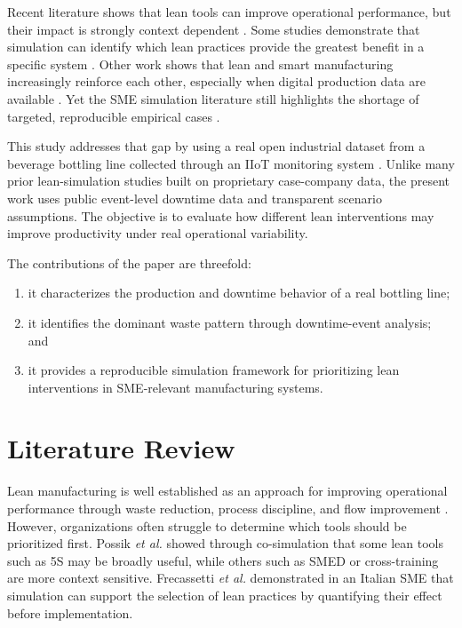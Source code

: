 \documentclass[journal]{IEEEtran}
\begin{document}
Recent literature shows that lean tools can improve operational performance, but their impact is strongly context dependent \cite{belekoukias2014lean, possik2022lean}. Some studies demonstrate that simulation can identify which lean practices provide the greatest benefit in a specific system \cite{frecassetti2023italian}. Other work shows that lean and smart manufacturing increasingly reinforce each other, especially when digital production data are available \cite{bokhorst2022smart, reslan2025digital}. Yet the SME simulation literature still highlights the shortage of targeted, reproducible empirical cases \cite{yu2021sme}.

This study addresses that gap by using a real open industrial dataset from a beverage bottling line collected through an IIoT monitoring system \cite{david2026dataset, david2024iot}. Unlike many prior lean-simulation studies built on proprietary case-company data, the present work uses public event-level downtime data and transparent scenario assumptions. The objective is to evaluate how different lean interventions may improve productivity under real operational variability.

The contributions of the paper are threefold:
\begin{enumerate}
    \item it characterizes the production and downtime behavior of a real bottling line;
    \item it identifies the dominant waste pattern through downtime-event analysis; and
    \item it provides a reproducible simulation framework for prioritizing lean interventions in SME-relevant manufacturing systems.
\end{enumerate}

\section{Literature Review}
Lean manufacturing is well established as an approach for improving operational performance through waste reduction, process discipline, and flow improvement \cite{belekoukias2014lean}. However, organizations often struggle to determine which tools should be prioritized first. Possik \emph{et al.} \cite{possik2022lean} showed through co-simulation that some lean tools such as 5S may be broadly useful, while others such as SMED or cross-training are more context sensitive. Frecassetti \emph{et al.} \cite{frecassetti2023italian} demonstrated in an Italian SME that simulation can support the selection of lean practices by quantifying their effect before implementation.
\end{document}
